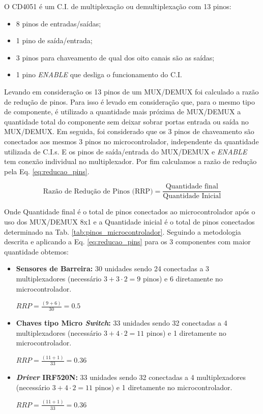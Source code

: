     O CD4051 é um C.I. de multiplexação ou demultiplexação com 13 pinos: 
    
    \begin{itemize}
        \item 8 pinos de entradas/saídas;
        \item 1 pino de saída/entrada;
        \item 3 pinos para chaveamento de qual dos oito canais são as saídas;
        \item 1 pino \textit{ENABLE} que desliga o funcionamento do C.I.
    \end{itemize}
    
    Levando em consideração os 13 pinos de um MUX/DEMUX foi calculado a razão de redução de pinos. Para isso é levado em consideração que, para o mesmo tipo de componente, é utilizado a quantidade mais próxima de MUX/DEMUX a quantidade total do componente sem deixar sobrar portas entrada ou saída no MUX/DEMUX. Em seguida, foi considerado que os 3 pinos de chaveamento são conectados aos mesmos 3 pinos no microcontrolador, independente da quantidade utilizada de C.I.s. E os pinos de saída/entrada do MUX/DEMUX e \textit{ENABLE} tem conexão individual no multiplexador. Por fim calculamos a razão de redução pela Eq. \ref{eq:reducao_pins}.
    
    \begin{equation}\label{eq:reducao_pins}
        \text{Razão de Redução de Pinos (RRP)} = \frac{\text{Quantidade final}}{\text{Quantidade Inicial}}
    \end{equation}
    
    Onde Quantidade final é o total de pinos conectados ao microcontrolador após o uso dos MUX/DEMUX 8x1 e a Quantidade inicial é o total de pinos conectados determinado na Tab. \ref{tab:pinos_microcontrolador}. Seguindo a metodologia descrita e aplicando a Eq. \ref{eq:reducao_pins} para os 3 componentes com maior quantidade obtemos:
    
    \begin{itemize}
        \item \textbf{Sensores de Barreira:} 30 unidades sendo 24 conectadas a 3 multiplexadores (necessário $3 + 3\cdot2 = 9$ pinos) e 6 diretamente no microcontrolador. 
        
        $RRP = \frac{(9 + 6)}{30} = 0.5$
        
        \item \textbf{Chaves tipo Micro \textit{Switch}:} 33 unidades sendo 32 conectadas a 4 multiplexadores (necessário $3 + 4\cdot2 = 11$ pinos) e 1 diretamente no microcontrolador. 
        
        $RRP = \frac{(11 + 1)}{33} = 0.36$
        
        \item \textbf{\textit{Driver} IRF520N:} 33 unidades sendo 32 conectadas a 4 multiplexadores (necessário $3 + 4\cdot2 = 11$ pinos) e 1 diretamente no microcontrolador. 
        
        $RRP = \frac{(11 + 1)}{33} = 0.36$
        
    \end{itemize}
    
